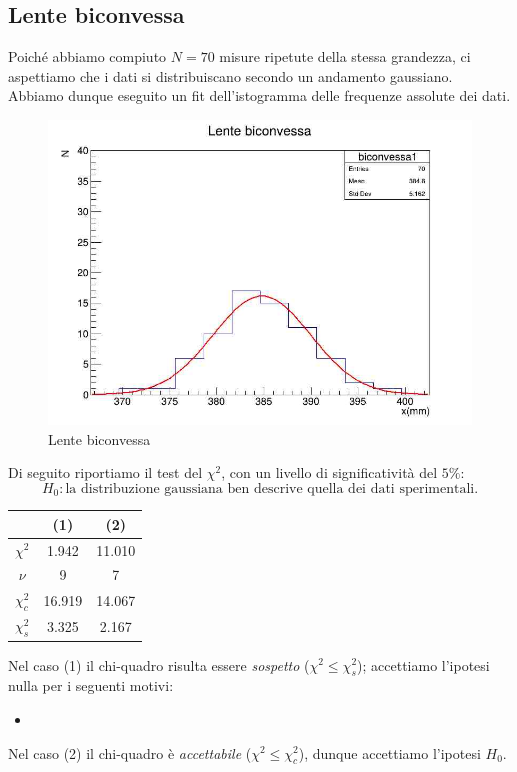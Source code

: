 \documentclass[a4paper]{article}
\begin{document}
    \subsection{Lente biconvessa}
    Poiché abbiamo compiuto $N=70$ misure ripetute della stessa grandezza, ci aspettiamo che i dati si distribuiscano secondo un andamento gaussiano. Abbiamo dunque eseguito un fit dell'istogramma delle frequenze assolute dei dati.
    \begin{figure}[H]
    	\centering
    	\includegraphics[width=0.75\linewidth]{histo1.jpg}
    	\caption{Lente biconvessa}
    	\label{fig:biconvessa}
    \end{figure}
    Di seguito riportiamo il test del $\chi^2$, con un livello di significatività del $5\%$:
    \[
    H_0: \text{la distribuzione gaussiana ben descrive quella dei dati sperimentali.}
    \]
    \begin{table}[H]
    	\centering
    	\begin{tabular}{|c|c|c|}
    		\hline
    		 & (1) & (2) \\ \hline
    		$\chi^2$ & 1.942 & 11.010 \\
    		$\nu$ & 9 & 7 \\
    		$\chi^2_c$ & 16.919 & 14.067 \\
    		$\chi^2_s$ & 3.325 & 2.167 \\ \hline
    	\end{tabular}
    	\label{tab:chi-quadro-biconvessa}
    \end{table}Nel caso (1) il chi-quadro risulta essere \textit{sospetto} ($\chi^2\leq\chi^2_s$); accettiamo l'ipotesi nulla per i seguenti motivi:
    \begin{itemize}
    	\item %
    \end{itemize}Nel caso (2) il chi-quadro è \textit{accettabile} ($\chi^2\leq\chi^2_c$), dunque accettiamo l'ipotesi $H_0$.
    
\end{document}
